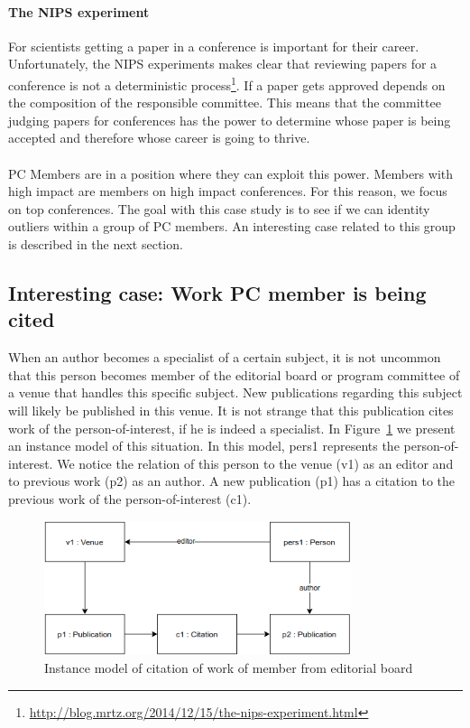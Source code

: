 \documentclass{ou-report}
\begin{document}
\paragraph{The NIPS experiment}
For scientists getting a paper in a conference is important for their career. 
Unfortunately, the NIPS experiments makes clear that reviewing papers for a 
conference is not a deterministic
process\footnote{\url{http://blog.mrtz.org/2014/12/15/the-nips-experiment.html}}.
If a paper gets approved depends on the composition of the 
responsible committee. This means that the committee judging papers for 
conferences has the power to determine whose paper is being accepted and 
therefore whose career is going to thrive.

\paragraph{}
PC Members are in a position where they can exploit this power. Members with
high impact are members on high impact conferences. For this reason, we focus on
top conferences. The goal with this case study is to see if we can identity outliers 
within a group of PC members.
An interesting case related to this group is described in the next section.

\subsection{Interesting case: Work PC member is being cited}
\label{interesting_case:work_member_editorial_board_cited}
When an author becomes a specialist of a certain subject, it is not uncommon 
that this person becomes member of the editorial board or program committee of a 
venue that handles this specific subject.
New publications regarding this subject will likely be published in this venue. 
It is not strange that this publication cites work of the person-of-interest, if 
he is indeed a specialist.
In Figure~\ref{fig:cweb} we present an instance model of this situation. In this 
model, pers1 represents the person-of-interest. We notice the relation of this 
person to the venue (v1) as an editor and to previous work (p2) as an author. A 
new publication (p1) has a citation to the previous work of the 
person-of-interest (c1).

\begin{figure}[H]
\centering
\includegraphics[width=9cm]{images/cite_work_editorial_board.drawio.png}
\caption{Instance model of citation of work of member from editorial board}
\label{fig:cweb}
\end{figure}
\end{document}
